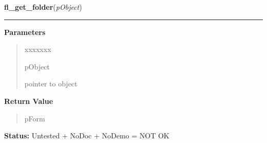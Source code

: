 \hspace{.8\funcindent}\begin{boxedminipage}{\funcwidth}

    \raggedright \textbf{fl\_get\_folder}(\textit{pObject})

    \vspace{-1.5ex}

    \rule{\textwidth}{0.5\fboxrule}
\setlength{\parskip}{2ex}
\setlength{\parskip}{1ex}
      \textbf{Parameters}
      \vspace{-1ex}

      \begin{quote}
        \begin{Ventry}{xxxxxxx}

          \item[pObject]

          pointer to object

        \end{Ventry}

      \end{quote}

      \textbf{Return Value}
    \vspace{-1ex}

      \begin{quote}
      pForm

      \end{quote}

\textbf{Status:} Untested + NoDoc + NoDemo = NOT OK



    \end{boxedminipage}

    \label{xformslib:library:fl_get_folder_number}

    \vspace{0.5ex}

